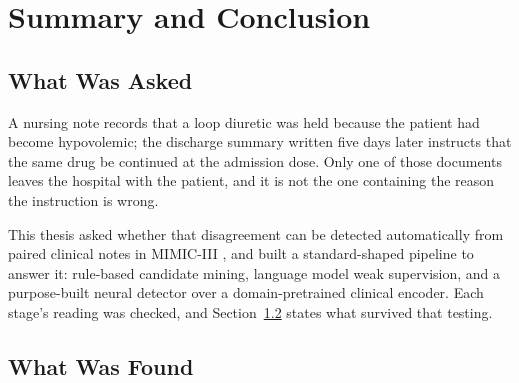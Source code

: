 %
%
%
%

\chapter{Summary and Conclusion}
\label{ch:conclusion}

\section{What Was Asked}
\label{sec:conc-asked}

A nursing note records that a loop diuretic was held because the patient had
become hypovolemic; the discharge summary written five days later instructs
that the same drug be continued at the admission dose. Only one of those
documents leaves the hospital with the patient, and it is not the one
containing the reason the instruction is wrong.

This thesis asked whether that disagreement can be detected automatically
from paired clinical notes in MIMIC-III \citep{johnson2016mimic}, and built a
standard-shaped pipeline to answer it: rule-based candidate mining, language
model weak supervision, and a purpose-built neural detector over a
domain-pretrained clinical encoder. Each stage's reading was checked, and Section~\ref{sec:conc-found} states what survived that testing.

\section{What Was Found}
\label{sec:conc-found}

